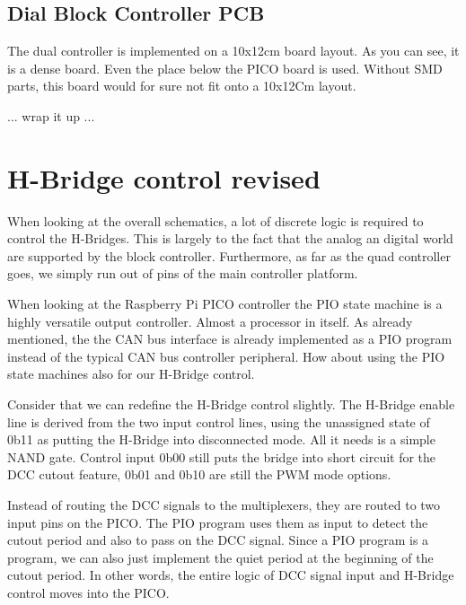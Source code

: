 \subsection{Dial Block Controller PCB}

The dual controller is implemented on a 10x12cm board layout. As you can see, it is a dense board. Even the place below the PICO board is used. Without SMD parts, this board would for sure not fit onto a 10x12Cm layout.



... wrap it up ...


\section{H-Bridge control revised}

When looking at the overall schematics, a lot of discrete logic is required to control the H-Bridges. This is largely to the fact that the analog an digital world are supported by the block controller. Furthermore, as far as the quad controller goes, we simply run out of pins of the main controller platform. 

When looking at the Raspberry Pi PICO controller the PIO state machine is a highly versatile output controller. Almost a processor in itself. As already mentioned, the the CAN bus interface is already implemented as a PIO program instead of the typical CAN bus controller peripheral. How about using the PIO state machines also for our H-Bridge control. 

Consider that we can redefine the H-Bridge control slightly. The H-Bridge enable line is derived from the two  input control lines, using the unassigned state of 0b11 as putting the H-Bridge into disconnected mode. All it needs is a simple NAND gate. Control input 0b00 still puts the bridge into short circuit for the DCC cutout feature, 0b01 and 0b10 are still the PWM mode options. 

Instead of routing the DCC signals to the multiplexers, they are routed to two input pins on the PICO. The PIO program uses them as input to detect the cutout period and also to pass on the DCC signal. Since a PIO program is a program, we can also just implement the quiet period at the beginning of the cutout period. In other words, the entire logic of DCC signal input and H-Bridge control moves into the PICO. 

